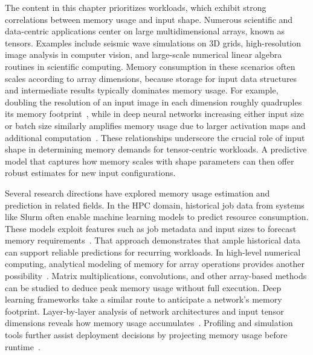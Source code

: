 The content in this chapter prioritizes  workloads, which exhibit strong correlations between memory usage and input shape.
Numerous scientific and data-centric applications center on large multidimensional arrays, known as tensors.
Examples include seismic wave simulations on \ac{3D} grids, high-resolution image analysis in computer vision, and large-scale numerical linear algebra routines in scientific computing.
Memory consumption in these scenarios often scales according to array dimensions, because storage for input data structures and intermediate results typically dominates memory usage.
For example, doubling the resolution of an input image in each dimension roughly quadruples its memory footprint~\cite{stackoverflow_memory_inv}, while in deep neural networks increasing either input size or batch size similarly amplifies memory usage due to larger activation maps and additional computation~\cite{dell_3dunet_memory}.
These relationships underscore the crucial role of input shape in determining memory demands for tensor-centric workloads.
A predictive model that captures how memory scales with shape parameters can then offer robust estimates for new input configurations.

Several research directions have explored memory usage estimation and prediction in related fields.
In the \ac{HPC} domain, historical job data from systems like Slurm often enable machine learning models to predict resource consumption.
These models exploit features such as job metadata and input sizes to forecast memory requirements~\cite{yoo2003slurm}.
That approach demonstrates that ample historical data can support reliable predictions for recurring workloads.
In high-level numerical computing, analytical modeling of memory for array operations provides another possibility~\cite{cornell_memory_workshop}.
Matrix multiplications, convolutions, and other array-based methods can be studied to deduce peak memory usage without full execution.
Deep learning frameworks take a similar route to anticipate a network's memory footprint.
Layer-by-layer analysis of network architectures and input tensor dimensions reveals how memory usage accumulates~\cite{gao2020, dell_3dunet_memory}.
Profiling and simulation tools further assist deployment decisions by projecting memory usage before runtime~\cite{tanash2019}.

